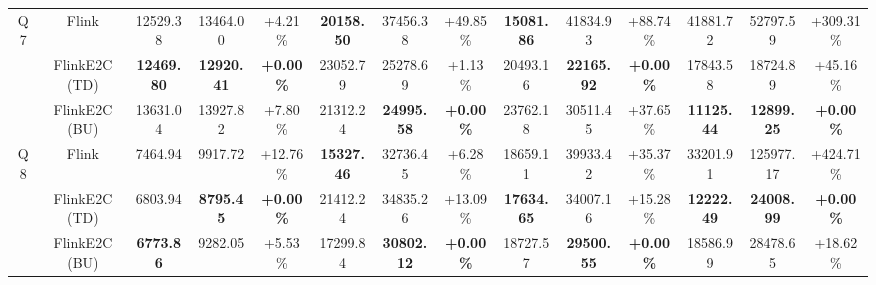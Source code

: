 \begin{tabular}{@{} c c c c c c c c c c c c c c @{}}
  \cmidrule(lr){1-14}
  \multirow{3}{*}{Q7} & Flink & \num{12529.38} & \num{13464.00} & +\num{4.21}\% & {\bfseries \num{20158.50}} & \num{37456.38} & +\num{49.85}\% & {\bfseries \num{15081.86}} & \num{41834.93} & +\num{88.74}\% & \num{41881.72} & \num{52797.59} & +\num{309.31}\% \\
   & FlinkE2C (TD) & {\bfseries \num{12469.80}} & {\bfseries \num{12920.41}} & {\bfseries +\num{0.00}\%} & \num{23052.79} & \num{25278.69} & +\num{1.13}\% & \num{20493.16} & {\bfseries \num{22165.92}} & {\bfseries +\num{0.00}\%} & \num{17843.58} & \num{18724.89} & +\num{45.16}\% \\
   & FlinkE2C (BU) & \num{13631.04} & \num{13927.82} & +\num{7.80}\% & \num{21312.24} & {\bfseries \num{24995.58}} & {\bfseries +\num{0.00}\%} & \num{23762.18} & \num{30511.45} & +\num{37.65}\% & {\bfseries \num{11125.44}} & {\bfseries \num{12899.25}} & {\bfseries +\num{0.00}\%} \\
  \cmidrule(lr){1-14}
  \multirow{3}{*}{Q8} & Flink & \num{7464.94} & \num{9917.72} & +\num{12.76}\% & {\bfseries \num{15327.46}} & \num{32736.45} & +\num{6.28}\% & \num{18659.11} & \num{39933.42} & +\num{35.37}\% & \num{33201.91} & \num{125977.17} & +\num{424.71}\% \\
   & FlinkE2C (TD) & \num{6803.94} & {\bfseries \num{8795.45}} & {\bfseries +\num{0.00}\%} & \num{21412.24} & \num{34835.26} & +\num{13.09}\% & {\bfseries \num{17634.65}} & \num{34007.16} & +\num{15.28}\% & {\bfseries \num{12222.49}} & {\bfseries \num{24008.99}} & {\bfseries +\num{0.00}\%} \\
   & FlinkE2C (BU) & {\bfseries \num{6773.86}} & \num{9282.05} & +\num{5.53}\% & \num{17299.84} & {\bfseries \num{30802.12}} & {\bfseries +\num{0.00}\%} & \num{18727.57} & {\bfseries \num{29500.55}} & {\bfseries +\num{0.00}\%} & \num{18586.99} & \num{28478.65} & +\num{18.62}\% \\
  \bottomrule
\end{tabular}
